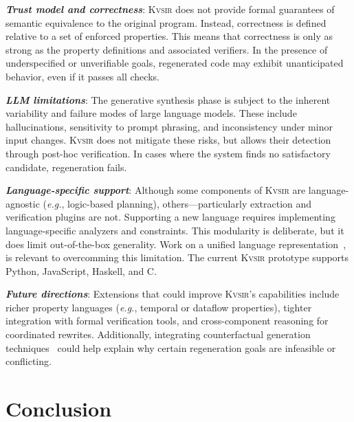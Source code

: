 \documentclass[noacm,sigplan]{acmart}
\def\eg{{\em e.g.}, }
\newcommand{\sys}{{\scshape Kv{\textalpha}sir}\xspace}
\newcommand{\heading}[1]{\vspace{2pt}\noindent\textbf{\emph{#1}}:\enspace}
\begin{document}
\heading{Trust model and correctness}
\sys
does not provide formal guarantees
of semantic equivalence
to the original program.
Instead,
correctness is defined relative to a set of enforced properties.
This means that correctness is only as strong as the property definitions and associated verifiers.
In the presence of underspecified or unverifiable goals,
regenerated code
may exhibit unanticipated behavior,
even if it passes all checks. 


\heading{LLM limitations}
The generative synthesis phase
is subject to the inherent variability and failure modes
of large language models.
These include hallucinations,
sensitivity to prompt phrasing,
and inconsistency
under minor input changes.
\sys does not mitigate these risks,
but allows their detection
through post-hoc verification.
In cases where the system finds no satisfactory candidate,
regeneration fails.


\heading{Language-specific support}
Although some components of \sys are language-agnostic (\eg logic-based planning),
others---particularly extraction and verification plugins are not.
Supporting a new language
requires implementing language-specific analyzers and constraints.
This modularity is deliberate,
but it does limit out-of-the-box generality.
Work on a unified language representation~\cite{koppel2018onetool,bap2011,dillig2009sail},
is relevant to overcomming this limitation.
The current \sys prototype
supports Python, JavaScript, Haskell, and C. 


\heading{Future directions}
Extensions that could improve \sys's capabilities include richer property languages (\eg temporal or dataflow properties), tighter integration with formal verification tools, and cross-component reasoning for coordinated rewrites.
Additionally, integrating counterfactual generation techniques~\cite{Cabalar_2020} could help explain why certain regeneration goals are infeasible or conflicting.


\section{Conclusion}



\end{document}
